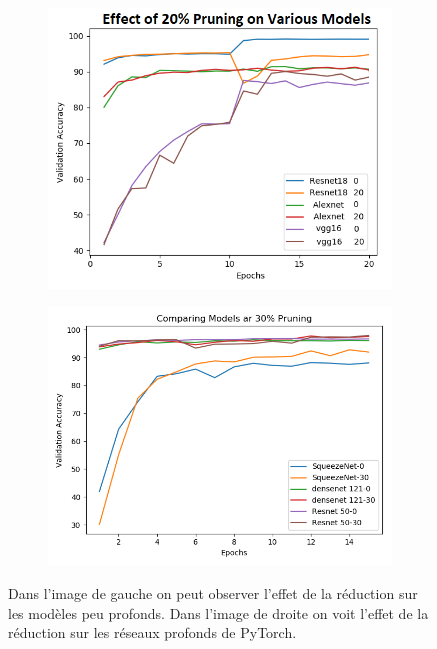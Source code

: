 \documentclass[12pt]{article}
\begin{document}
\begin{figure}[H]
	\centering
	\begin{subfigure}[b]{0.5\textwidth}            
		\includegraphics[width=\textwidth]{various_models_shallow}
		\label{fig:SRl}
	\end{subfigure}%
	\begin{subfigure}[b]{0.5\textwidth}
		\centering
		\includegraphics[width=\textwidth]{various_models_deep}
		\label{fig:D-Imager}
	\end{subfigure}
	\caption{Dans l'image de gauche on peut observer l'effet de la réduction sur les modèles peu profonds. Dans l'image de droite on voit l'effet de la réduction sur les réseaux profonds de PyTorch.}
\end{figure}
\end{document}
